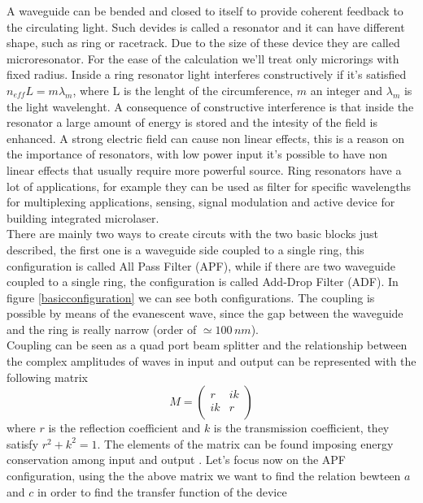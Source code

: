A waveguide can be bended and closed to itself to provide coherent feedback to the circulating light. Such devides is called a resonator and it can have different shape, such as ring or racetrack. Due to the size of these device they are called microresonator. For the ease of the calculation we'll treat only microrings with fixed radius. Inside a ring resonator light interferes constructively if it's satisfied $n_{eff} L = m \lambda_m$, where L is the lenght of the circumference, $m$ an integer and $\lambda_m$ is the light wavelenght. A consequence of constructive interference is that inside the resonator a large amount of energy is stored and the intesity of the field is enhanced. A strong electric field can cause non linear effects, this is a reason on the importance of resonators, with low power input it's possible to have non linear effects that usually require more powerful source. Ring resonators have a lot of applications, for example they can be used as filter for specific wavelengths for multiplexing applications, sensing, signal modulation and active device for building integrated microlaser.\\
There are mainly two ways to create circuts with the two basic blocks just described, the first one is a waveguide side coupled to a single ring, this configuration is called All Pass Filter (APF), while if there are two waveguide coupled to a single ring, the configuration is called Add-Drop Filter (ADF). In figure \ref{basicconfiguration} we can see both configurations. The coupling is possible by means of the evanescent wave, since the gap between the waveguide and the ring is really narrow (order of $\simeq 100\, nm$).\\
Coupling can be seen as a quad port beam splitter and the relationship between the complex amplitudes of waves in input and output can be represented with the following matrix
\begin{equation}M = \begin{pmatrix}
r & ik \\
ik & r\\
\end{pmatrix}\end{equation}
where $r$ is the reflection coefficient and $k$ is the transmission coefficient, they satisfy $r^2 +k^2 = 1$. The elements of the matrix can be found imposing energy conservation among input and output \cite{thesis:masi}. Let's focus now on the APF configuration, using the the above matrix we want to find the relation bewteen $a$ and $c$ in order to find the transfer function of the device
